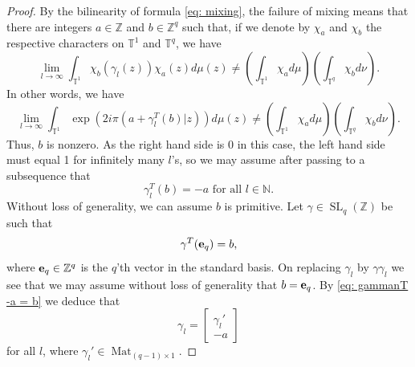 \documentclass[reqno,11pt, twoside]{amsart}
\theoremstyle{plain}
\theoremstyle{definition}
\theoremstyle{definition}
\theoremstyle{remark}
\numberwithin{equation}{section}
\newcommand{\SL}{\operatorname{SL}}
\newcommand{\T}{{\mathbb{T}}}
\newcommand{\Z}{{\mathbb{Z}}}
\newcommand{\N}{{\mathbb{N}}}
\newcommand{\ve}{{\bf e}}
\newcommand{\ga}{\gamma}
\newcommand{\bZ}{\mathbb{Z}}
\newcommand\on[1]{\operatorname{#1}}
\newcommand\br[1]{\left[#1\right]}
\begin{document}
\begin{proof}
    By the bilinearity of formula \eqref{eq: mixing}, the failure of mixing means that there are integers $a \in \Z$ and $b \in \Z^q$ such that, if we denote by $\chi_a$ and $\chi_b$ the respective characters on $\T^1$ and $\T^q$, we have
    \begin{equation*}
        \lim_{l \to \infty} \int_{\T^1} \chi_b(\gamma_l(z)) \chi_a(z)d \mu(z) \neq \left(\int_{\T^1} \chi_a d\mu\right) \left(\int_{\T^q} \chi_b d\nu\right).
    \end{equation*}
    In other words, we have
    \begin{equation*}
        \lim_{l \to \infty} \int_{\T^1} \exp(2i\pi(a + \gamma_l^T(b)| z)) d\mu(z) \neq \left(\int_{\T^1} \chi_a d\mu\right) \left(\int_{\T^q} \chi_b d\nu\right).
    \end{equation*}
    Thus, $b$ is nonzero.
    As the right hand side is $0$ in this case, the left hand side must equal 1 for infinitely many $l$'s, so we may assume after passing to a subsequence that 
    \begin{equation}\label{eq: gammanT -a = b}
        \gamma_l^T(b) = -a \text{ for all } l \in \N.
    \end{equation}
    Without loss of generality, we can assume $b$ is primitive. 
    Let $\gamma \in \SL_{q}(\Z)$ be such that 
    \begin{equation}\label{eq: gammaY eq = b}
        \gamma^T(\ve_q) = b,
    \end{equation}
    where $\ve_q\in \bZ^q$ is the $q$'th vector in the standard basis. 
    On replacing $\ga_l$ by $\ga\ga_l$ we see that we may assume without loss of generality that $b=\ve_q$.  By \eqref{eq: gammanT -a = b} we deduce that
    \begin{equation}\label{eq: gan coor}
    \ga_l = \br{
    \begin{array}{c}
    \ga_l'\\ -a 
    \end{array}
    }
    \end{equation}
    for all $l$, where $\ga_l'\in \on{Mat}_{(q-1)\times 1}$. 


\end{proof}
\end{document}

